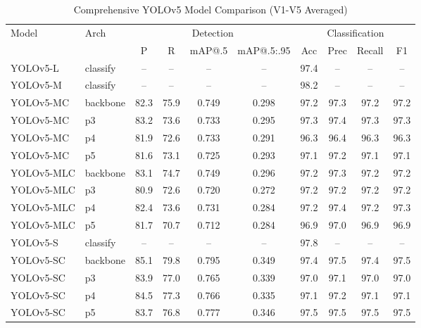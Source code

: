\begin{table}[htbp]
\centering
\caption{Comprehensive YOLOv5 Model Comparison (V1-V5 Averaged)}
\label{tab:comprehensive_comparison}
\scriptsize
\begin{tabular}{l|l|cccc|cccc}
\hline
\multirow{2}{*}{Model} & \multirow{2}{*}{Arch} & \multicolumn{4}{c|}{Detection} & \multicolumn{4}{c}{Classification} \\
\cline{3-10}
& & P & R & mAP@.5 & mAP@.5:.95 & Acc & Prec & Recall & F1 \\
\hline
YOLOv5-L & classify & -- & -- & -- & -- & 97.4 & -- & -- & -- \\
YOLOv5-M & classify & -- & -- & -- & -- & 98.2 & -- & -- & -- \\
YOLOv5-MC & backbone & 82.3 & 75.9 & 0.749 & 0.298 & 97.2 & 97.3 & 97.2 & 97.2 \\
YOLOv5-MC & p3 & 83.2 & 73.6 & 0.733 & 0.295 & 97.3 & 97.4 & 97.3 & 97.3 \\
YOLOv5-MC & p4 & 81.9 & 72.6 & 0.733 & 0.291 & 96.3 & 96.4 & 96.3 & 96.3 \\
YOLOv5-MC & p5 & 81.6 & 73.1 & 0.725 & 0.293 & 97.1 & 97.2 & 97.1 & 97.1 \\
YOLOv5-MLC & backbone & 83.1 & 74.7 & 0.749 & 0.296 & 97.2 & 97.3 & 97.2 & 97.2 \\
YOLOv5-MLC & p3 & 80.9 & 72.6 & 0.720 & 0.272 & 97.2 & 97.2 & 97.2 & 97.2 \\
YOLOv5-MLC & p4 & 82.4 & 73.6 & 0.731 & 0.284 & 97.2 & 97.4 & 97.2 & 97.3 \\
YOLOv5-MLC & p5 & 81.7 & 70.7 & 0.712 & 0.284 & 96.9 & 97.0 & 96.9 & 96.9 \\
YOLOv5-S & classify & -- & -- & -- & -- & 97.8 & -- & -- & -- \\
YOLOv5-SC & backbone & 85.1 & 79.8 & 0.795 & 0.349 & 97.4 & 97.5 & 97.4 & 97.5 \\
YOLOv5-SC & p3 & 83.9 & 77.0 & 0.765 & 0.339 & 97.0 & 97.1 & 97.0 & 97.0 \\
YOLOv5-SC & p4 & 84.5 & 77.3 & 0.766 & 0.335 & 97.1 & 97.2 & 97.1 & 97.1 \\
YOLOv5-SC & p5 & 83.7 & 76.8 & 0.777 & 0.346 & 97.5 & 97.5 & 97.5 & 97.5 \\
\hline
\end{tabular}
\end{table}